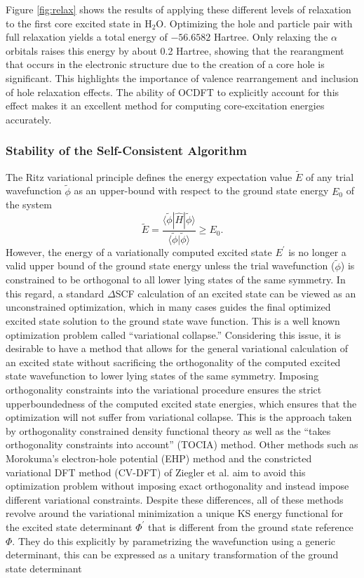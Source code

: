 \documentclass{article}
\begin{document}
Figure \ref{fig:relax} shows the results of applying these different levels of relaxation to the first core excited state in H$_2$O. Optimizing the hole and particle pair with full relaxation yields a total energy of $- 56.6582$ Hartree. Only relaxing the $\alpha$ orbitals raises this energy by about 0.2 Hartree, showing that the rearangment that occurs in the electronic structure due to the creation of a core hole is significant. This highlights the importance of valence rearrangement and inclusion of hole relaxation effects. The ability of OCDFT to explicitly account for this effect makes it an excellent method for computing core-excitation energies accurately. 
\subsubsection{Stability of the Self-Consistent Algorithm}
The Ritz variational principle defines the energy expectation value $\tilde{E}$ of any trial wavefunction $\tilde{\phi}$ as an upper-bound with respect to the ground state energy $E_0$ of the system
\begin{equation}
\tilde{E} = \frac{\langle \tilde{\phi}| \hat{H} | \tilde{\phi}\rangle}{\langle\tilde{\phi}|\tilde{\phi}\rangle} \geq E_0.
\end{equation} 
However, the energy of a variationally computed excited state $E^{\prime}$ is no longer a valid upper bound of the ground state energy unless the trial wavefunction ($\tilde{\phi}$) is constrained to be orthogonal to all lower lying states of the same symmetry. In this regard, a standard $\Delta$SCF calculation of an excited state can be viewed as an unconstrained optimization, which in many cases guides the final optimized excited state solution to the ground state wave function. This is a well known optimization problem called ``variational collapse.'' Considering this issue, it is desirable to have a method that allows for the general variational calculation of an excited state without sacrificing the orthogonality of the computed excited state wavefunction to lower lying states of the same symmetry. Imposing orthogonality constraints into the variational procedure ensures the strict upperboundedness of the computed excited state energies, which ensures that the optimization will not suffer from variational collapse. This is the approach taken by orthogonality constrained density functional theory as well as the ``takes orthogonality constraints into account'' (TOCIA) method.\cite{tsaune_towards_1994} Other methods such as Morokuma's electron-hole potential (EHP) method\cite{morokuma_extended_1972} and the constricted variational DFT method (CV-DFT) of Ziegler et al. \cite{cullen_formulation_2011,ziegler_implementation_2012} aim to avoid this optimization problem without imposing exact orthogonality and instead impose different variational constraints. Despite these differences, all of these methods revolve around the variational minimization a unique KS energy functional for the excited state determinant $\Phi^{\prime}$ that is different from the ground state reference $\Phi$. They do this explicitly by parametrizing the wavefunction using a generic determinant, this can be expressed as a unitary transformation of the ground state determinant
\end{document}
